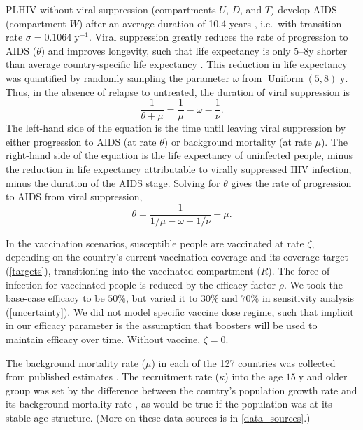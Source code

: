 \documentclass{article}
\DeclareMathOperator{\Uniform}{Uniform}
\begin{document}
PLHIV without viral suppression (compartments $U$, $D$, and $T$)
develop AIDS (compartment $W$) after an average duration of 10.4
years \cite{Morgan2002-cq}, i.e.~with transition rate
$\sigma = 0.1064\;\text{y$^{-1}$}$.  Viral suppression greatly reduces
the rate of progression to AIDS ($\theta$) and improves longevity,
such that life expectancy is only $5$--$8$\;y shorter than average
country-specific life expectancy \cite{Samji2013-kf, Unaids2014-ue}.
This reduction in life expectancy was quantified by randomly sampling
the parameter $\omega$ from $\Uniform(5, 8)\;\text{y}$. Thus, in the
absence of relapse to untreated, the duration of viral suppression is
\begin{equation}
  \frac{1}{\theta + \mu} = \frac{1}{\mu} - \omega - \frac{1}{\nu}.
\end{equation}
The left-hand side of the equation is the time until leaving viral
suppression by either progression to AIDS (at rate $\theta$) or
background mortality (at rate $\mu$).  The right-hand side of the
equation is the life expectancy of uninfected people, minus the
reduction in life expectancy attributable to virally suppressed HIV
infection, minus the duration of the AIDS stage.  Solving for $\theta$
gives the rate of progression to AIDS from viral suppression,
\begin{equation}
  \label{theta}
  \theta = \frac{1}{1/\mu - \omega - 1/\nu} - \mu.
\end{equation}

In the vaccination scenarios, susceptible people are vaccinated at
rate $\zeta$, depending on the country's current vaccination coverage
and its coverage target (\autoref{targets}), transitioning into the
vaccinated compartment ($R$).  The force of infection for vaccinated
people is reduced by the efficacy factor $\rho$.  We took the
base-case efficacy to be $50\%$, but varied it to $30\%$ and $70\%$ in
sensitivity analysis (\autoref{uncertainty}).  We did not model
specific vaccine dose regime, such that implicit in our efficacy
parameter is the assumption that boosters will be used to maintain
efficacy over time.  Without vaccine, $\zeta = 0$.

The background mortality rate ($\mu$) in each of the 127 countries was
collected from published
estimates \cite{World_Development_Indicators2013-ee}.  The recruitment
rate ($\kappa$) into the age $15\;\text{y}$ and older group was set by
the difference between the country's population growth
rate \cite{WorldBankpg} and its background mortality
rate \cite{World_Development_Indicators2013-ee}, as would be true if
the population was at its stable age structure.  (More on these data
sources is in \autoref{data_sources}.)
\end{document}

